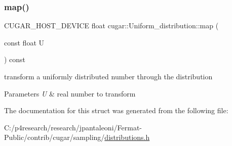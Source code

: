 \subsubsection{\texorpdfstring{map()}{map()}}
{\footnotesize\ttfamily C\+U\+G\+A\+R\+\_\+\+H\+O\+S\+T\+\_\+\+D\+E\+V\+I\+CE float cugar\+::\+Uniform\+\_\+distribution\+::map (\begin{DoxyParamCaption}\item[{const float}]{U }\end{DoxyParamCaption}) const\hspace{0.3cm}{\ttfamily [inline]}}

transform a uniformly distributed number through the distribution


\begin{DoxyParams}{Parameters}
{\em U} & real number to transform \\
\hline
\end{DoxyParams}


The documentation for this struct was generated from the following file\+:\begin{DoxyCompactItemize}
\item 
C\+:/p4research/research/jpantaleoni/\+Fermat-\/\+Public/contrib/cugar/sampling/\hyperlink{distributions_8h}{distributions.\+h}\end{DoxyCompactItemize}
